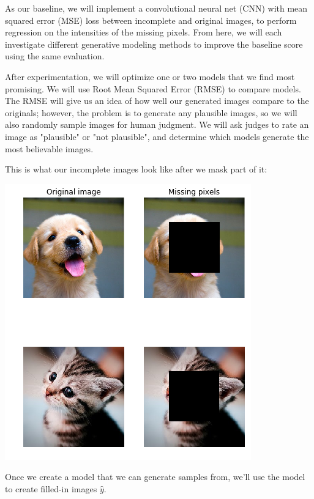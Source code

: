 \documentclass[10pt,twocolumn,letterpaper]{article}
\begin{document}
\par As our baseline, we will implement a convolutional neural net (CNN) with mean squared error (MSE) loss between incomplete and original images, to perform regression on the intensities of the missing pixels. From here, we will each investigate different generative modeling methods to improve the baseline score using the same evaluation.

\par After experimentation, we will optimize one or two models that we find most promising. We will use Root Mean Squared Error (RMSE) to compare models. The RMSE will give us an idea of how well our generated images compare to the originals; however, the problem is to generate any plausible images, so we will also randomly sample images for human judgment. We will ask judges to rate an image as "plausible" or "not plausible", and determine which models generate the most believable images. 

This is what our incomplete images look like after we mask part of it:

\includegraphics[width=1.0\linewidth]{img_sample.png}

Once we create a model that we can generate samples from, we'll use the model to create filled-in images $\hat{y}$.
\end{document}
